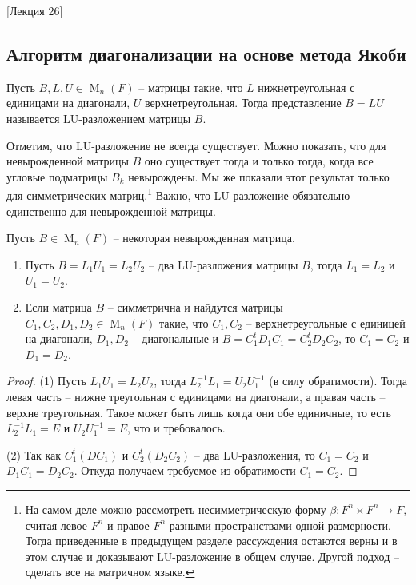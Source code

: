 [Лекция 26]

\subsection{Алгоритм диагонализации на основе метода Якоби}\label{subsection::JacobyAlg}

\begin{definition}
Пусть $B, L, U\in\operatorname{M}_n(F)$ -- матрицы такие, что $L$ нижнетреугольная с единицами на диагонали, $U$ верхнетреугольная. Тогда представление $B = LU$ называется LU-разложением матрицы $B$.
\end{definition}

Отметим, что LU-разложение не всегда существует. Можно показать, что для невырожденной матрицы $B$ оно существует тогда и только тогда, когда все угловые подматрицы $B_k$ невырождены. Мы же показали этот результат только для симметрических матриц.\footnote{На самом деле можно рассмотреть несимметрическую форму $\beta\colon F^n\times F^n \to F$, считая левое $F^n$ и правое $F^n$ разными пространствами одной размерности. Тогда приведенные в предыдущем разделе рассуждения остаются верны и в этом случае и доказывают LU-разложение в общем случае. Другой подход -- сделать все на матричном языке.} Важно, что LU-разложение обязательно единственно для невырожденной матрицы.

\begin{claim}
Пусть $B\in \operatorname{M}_n(F)$ -- некоторая невырожденная матрица.
\begin{enumerate}
\item Пусть $B = L_1 U_1 = L_2 U_2$ -- два LU-разложения матрицы $B$, тогда $L_1 = L_2$ и $U_1 = U_2$.

\item Если матрица $B$ -- симметрична и найдутся матрицы $C_1,C_2, D_1,D_2\in\operatorname{M}_n(F)$ такие, что $C_1, C_2$ -- верхнетреугольные с единицей на диагонали, $D_1, D_2$ -- диагональные и $B = C_1^t D_1 C_1 = C_2^t D_2 C_2$, то $C_1 = C_2$ и $D_1 = D_2$.
\end{enumerate}
\end{claim}
\begin{proof}
(1) Пусть $L_1 U_1 = L_2 U_2$, тогда $L_2^{-1}L_1 = U_2 U_1^{-1}$ (в силу обратимости). Тогда левая часть -- нижне треугольная с единицами на диагонали, а правая часть -- верхне треугольная. Такое может быть лишь когда они обе единичные, то есть $L_2^{-1} L_1 = E$ и $U_2 U_1^{-1} = E$, что и требовалось.

(2) Так как $C_1^t(DC_1)$ и $C_2^t(D_2 C_2)$ -- два LU-разложения, то $C_1 = C_2$ и $D_1C_1 = D_2C_2$. Откуда получаем требуемое из обратимости $C_1 = C_2$.
\end{proof}

